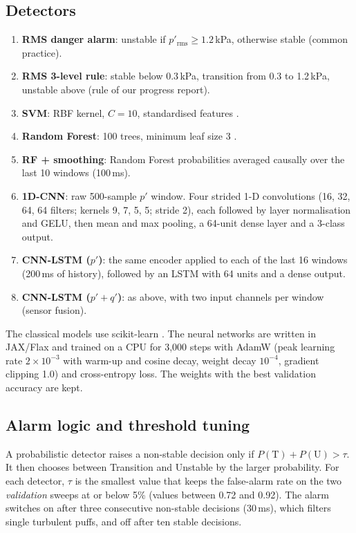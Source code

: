 \documentclass[11pt,a4paper]{article}
\newcommand{\pp}{p'}
\newcommand{\qq}{q'}
\begin{document}
\subsection{Detectors}
\begin{enumerate}
  \item \textbf{RMS danger alarm}: unstable if $p'_\mathrm{rms}\ge1.2$\,kPa, otherwise stable (common practice).
  \item \textbf{RMS 3-level rule}: stable below 0.3\,kPa, transition from 0.3 to 1.2\,kPa, unstable above (rule of our progress report).
  \item \textbf{SVM}: RBF kernel, $C=10$, standardised features \cite{cortes1995}.
  \item \textbf{Random Forest}: 100 trees, minimum leaf size 3 \cite{breiman2001}.
  \item \textbf{RF + smoothing}: Random Forest probabilities averaged causally over the last 10 windows (100\,ms).
  \item \textbf{1D-CNN}: raw 500-sample $\pp$ window. Four strided 1-D convolutions (16, 32, 64, 64 filters; kernels 9, 7, 5, 5; stride 2), each followed by layer normalisation and GELU, then mean and max pooling, a 64-unit dense layer and a 3-class output.
  \item \textbf{CNN-LSTM ($\pp$)}: the same encoder applied to each of the last 16 windows (200\,ms of history), followed by an LSTM with 64 units \cite{hochreiter1997} and a dense output.
  \item \textbf{CNN-LSTM ($\pp+\qq$)}: as above, with two input channels per window (sensor fusion).
\end{enumerate}
The classical models use scikit-learn \cite{pedregosa2011}. The neural networks are written in JAX/Flax \cite{jax2018} and trained on a CPU for 3{,}000 steps with AdamW \cite{loshchilov2019} (peak learning rate $2\times10^{-3}$ with warm-up and cosine decay, weight decay $10^{-4}$, gradient clipping 1.0) and cross-entropy loss. The weights with the best validation accuracy are kept.

\subsection{Alarm logic and threshold tuning}
A probabilistic detector raises a non-stable decision only if $P(\text{T})+P(\text{U})>\tau$. It then chooses between Transition and Unstable by the larger probability. For each detector, $\tau$ is the smallest value that keeps the false-alarm rate on the two \emph{validation} sweeps at or below 5\% (values between 0.72 and 0.92). The alarm switches on after three consecutive non-stable decisions (30\,ms), which filters single turbulent puffs, and off after ten stable decisions.
\end{document}
